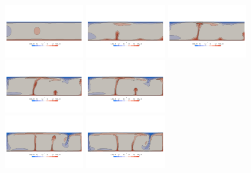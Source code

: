 \begin{center}
\includegraphics[width=3.5cm]{python_codes/fieldstone_88/results/model1/T0000.png}
\includegraphics[width=3.5cm]{python_codes/fieldstone_88/results/model1/T0001.png}
\includegraphics[width=3.5cm]{python_codes/fieldstone_88/results/model1/T0002.png}
\includegraphics[width=3.5cm]{python_codes/fieldstone_88/results/model1/T0003.png}
\includegraphics[width=3.5cm]{python_codes/fieldstone_88/results/model1/T0004.png}\\
\includegraphics[width=3.5cm]{python_codes/fieldstone_88/results/model1/T0005.png}
\includegraphics[width=3.5cm]{python_codes/fieldstone_88/results/model1/T0006.png}

\end{center}
